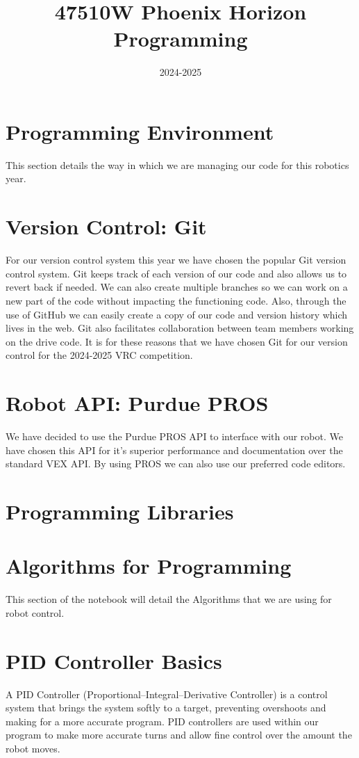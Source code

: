 \documentclass[12pt]{article}
\title{47510W Phoenix Horizon Programming}
\date{2024-2025}
\author{}
\begin{document}
 \maketitle
 \tableofcontents
 \newpage

\section*{Programming Environment}
This section details the way in which we are managing our code for this robotics year.
\section{Version Control: Git}
For our version control system this year we have chosen the popular Git version control system. Git keeps track of each version of our code and also allows us to revert back if needed. We can also create multiple branches so we can work on a new part of the code without impacting the functioning code. Also, through the use of GitHub we can easily create a copy of our code and version history which lives in the web. Git also facilitates collaboration between team members working on the drive code. It is for these reasons that we have chosen Git for our version control for the 2024-2025 VRC competition.
\section{Robot API: Purdue PROS}
We have decided to use the Purdue PROS API to interface with our robot. We have chosen this API for it's superior performance and documentation over the standard VEX API. By using PROS we can also use our preferred code editors.
\section{Programming Libraries}
\section*{Algorithms for Programming}
This section of the notebook will detail the Algorithms that we are using for robot control.
\section{PID Controller Basics}
    A PID Controller (Proportional–Integral–Derivative Controller) is a control system that brings the system softly to a target, preventing overshoots and making for a more accurate program. PID controllers are used within our program to make more accurate turns and allow fine control over the amount the robot moves.
\end{document}
